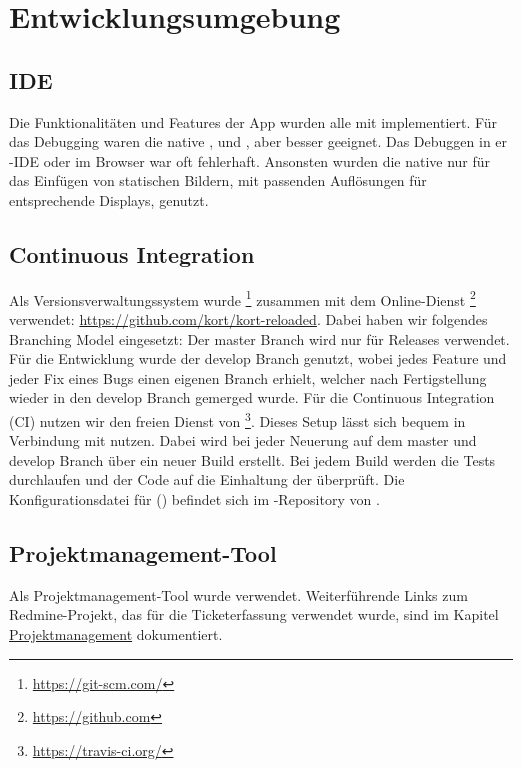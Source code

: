 \chapter{Entwicklungsumgebung}
\label{pd-entwicklungsumgebung}


\section{IDE}
Die Funktionalitäten und Features der App wurden alle mit  implementiert. 
Für das Debugging waren die native ,  und , aber besser geeignet. 
Das Debuggen in er -\gls{IDE} oder im  Browser war oft fehlerhaft. 
Ansonsten wurden die native  nur für das Einfügen von statischen Bildern, mit passenden Auflösungen für entsprechende Displays, genutzt. 


\section{Continuous Integration}
Als Versionsverwaltungssystem wurde \footnote{\url{https://git-scm.com/}} zusammen mit dem Online-Dienst \footnote{\url{https://github.com}} verwendet: \url{https://github.com/kort/kort-reloaded}.
Dabei haben wir folgendes Branching Model eingesetzt: Der master Branch wird nur für Releases verwendet.
Für die Entwicklung wurde der develop Branch genutzt, wobei jedes Feature und jeder Fix eines Bugs einen eigenen Branch erhielt, welcher nach Fertigstellung wieder in den develop Branch gemerged wurde.\newline
\newline
Für die Continuous Integration (\gls{CI}) nutzen wir den freien Dienst von \footnote{\url{https://travis-ci.org/}}.
Dieses Setup lässt sich bequem in Verbindung mit  nutzen. 
Dabei wird bei jeder Neuerung auf dem master und develop Branch über  ein neuer Build erstellt.
Bei jedem Build werden die Tests durchlaufen und der Code auf die Einhaltung der  überprüft.\newline
Die Konfigurationsdatei für  () befindet sich im -Repository von \kort{}.

\section{Projektmanagement-Tool}
Als Projektmanagement-Tool wurde  verwendet. 
Weiterführende Links zum Redmine-Projekt, das für die Ticketerfassung verwendet wurde, sind im Kapitel \hyperref[pm-projektmanagement]{Projektmanagement} dokumentiert.


